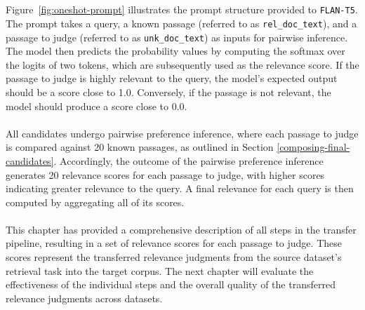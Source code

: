 \\\\
Figure~\ref{fig:oneshot-prompt} illustrates the prompt structure provided to \texttt{FLAN-T5}. The prompt takes a query, a known passage (referred to as \texttt{rel\_doc\_text}), and a passage to judge (referred to as \texttt{unk\_doc\_text}) as inputs for pairwise inference. The model then predicts the probability values by computing the softmax over the logits of two tokens, which are subsequently used as the relevance score. If the passage to judge is highly relevant to the query, the model's expected output should be a score close to 1.0. Conversely, if the passage is not relevant, the model should produce a score close to 0.0.
\\\\
All candidates undergo pairwise preference inference, where each passage to judge is compared against 20 known passages, as outlined in Section \ref{composing-final-candidates}. Accordingly, the outcome of the pairwise preference inference generates 20 relevance scores for each passage to judge, with higher scores indicating greater relevance to the query. A final relevance for each query is then computed by aggregating all of its scores.
\\\\
This chapter has provided a comprehensive description of all steps in the transfer pipeline, resulting in a set of relevance scores for each passage to judge. These scores represent the transferred relevance judgments from the source dataset's retrieval task into the target corpus. The next chapter will evaluate the effectiveness of the individual steps and the overall quality of the transferred relevance judgments across datasets.